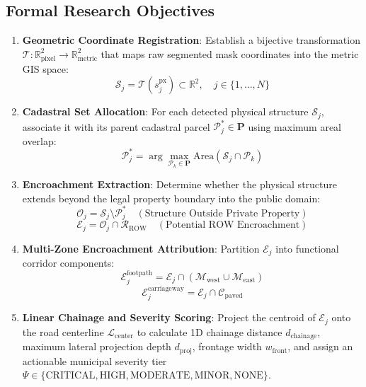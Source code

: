 \documentclass[conference]{IEEEtran}
\begin{document}
\subsection{Formal Research Objectives}
\begin{enumerate}
    \item \textbf{Geometric Coordinate Registration}: Establish a bijective transformation $\mathcal{T}: \mathbb{R}^2_{\text{pixel}} \to \mathbb{R}^2_{\text{metric}}$ that maps raw segmented mask coordinates into the metric GIS space:
    \begin{equation}
    \mathcal{S}_j = \mathcal{T}(s_j^{\text{px}}) \subset \mathbb{R}^2, \quad j \in \{1, \dots, N\}
    \end{equation}
    \item \textbf{Cadastral Set Allocation}: For each detected physical structure $\mathcal{S}_j$, associate it with its parent cadastral parcel $\mathcal{P}_j^* \in \mathbf{P}$ using maximum areal overlap:
    \begin{equation}
    \mathcal{P}_j^* = \arg\max_{\mathcal{P}_k \in \mathbf{P}} \text{Area}(\mathcal{S}_j \cap \mathcal{P}_k)
    \end{equation}
    \item \textbf{Encroachment Extraction}: Determine whether the physical structure extends beyond the legal property boundary into the public domain:
    \begin{equation}
    \mathcal{O}_j = \mathcal{S}_j \setminus \mathcal{P}_j^* \quad (\text{Structure Outside Private Property})
    \end{equation}
    \begin{equation}
    \mathcal{E}_j = \mathcal{O}_j \cap \mathcal{R}_{\text{ROW}} \quad (\text{Potential ROW Encroachment})
    \end{equation}
    \item \textbf{Multi-Zone Encroachment Attribution}: Partition $\mathcal{E}_j$ into functional corridor components:
    \begin{equation}
    \mathcal{E}_j^{\text{footpath}} = \mathcal{E}_j \cap (\mathcal{M}_{\text{west}} \cup \mathcal{M}_{\text{east}})
    \end{equation}
    \begin{equation}
    \mathcal{E}_j^{\text{carriageway}} = \mathcal{E}_j \cap \mathcal{C}_{\text{paved}}
    \end{equation}
    \item \textbf{Linear Chainage and Severity Scoring}: Project the centroid of $\mathcal{E}_j$ onto the road centerline $\mathcal{L}_{\text{center}}$ to calculate 1D chainage distance $d_{\text{chainage}}$, maximum lateral projection depth $d_{\text{proj}}$, frontage width $w_{\text{front}}$, and assign an actionable municipal severity tier $\Psi \in \{\text{CRITICAL}, \text{HIGH}, \text{MODERATE}, \text{MINOR}, \text{NONE}\}$.
\end{enumerate}
\end{document}

